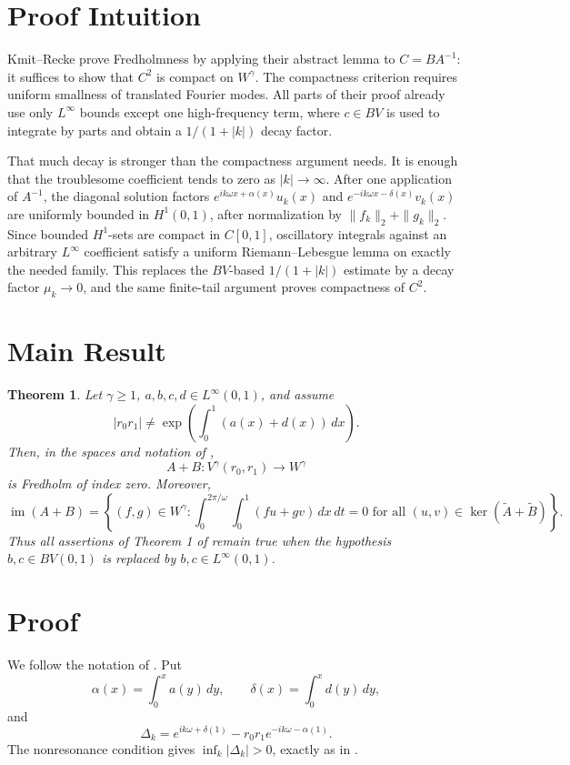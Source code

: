 \documentclass[11pt]{article}
\newtheorem{theorem}{Theorem}
\newcommand{\om}{\omega}
\newcommand{\ga}{\gamma}
\newcommand{\al}{\alpha}
\newcommand{\de}{\delta}
\newcommand{\Linfty}{L^\infty}
\newcommand{\im}{\operatorname{im}}
\begin{document}
\section*{Proof Intuition}

Kmit--Recke prove Fredholmness by applying their abstract lemma to
\(C=BA^{-1}\): it suffices to show that \(C^2\) is compact on \(W^\ga\).
The compactness criterion requires uniform smallness of translated Fourier
modes. All parts of their proof already use only \(L^\infty\) bounds except one
high-frequency term, where \(c\in BV\) is used to integrate by parts and obtain
a \(1/(1+|k|)\) decay factor.

That much decay is stronger than the compactness argument needs. It is enough
that the troublesome coefficient tends to zero as \(|k|\to\infty\). After one
application of \(A^{-1}\), the diagonal solution factors
\(e^{ik\om x+\al(x)}u_k(x)\) and \(e^{-ik\om x-\de(x)}v_k(x)\) are uniformly
bounded in \(H^1(0,1)\), after normalization by
\(\|f_k\|_2+\|g_k\|_2\). Since bounded \(H^1\)-sets are compact in \(C[0,1]\),
oscillatory integrals against an arbitrary \(L^\infty\) coefficient satisfy a
uniform Riemann--Lebesgue lemma on exactly the needed family. This replaces the
\(BV\)-based \(1/(1+|k|)\) estimate by a decay factor \(\mu_k\to 0\), and the
same finite-tail argument proves compactness of \(C^2\).

\section*{Main Result}

\begin{theorem}
Let \(\ga\ge 1\), \(a,b,c,d\in \Linfty(0,1)\), and assume
\[
  |r_0r_1|\ne
  \exp\left(\int_0^1(a(x)+d(x))\,dx\right).
\]
Then, in the spaces and notation of \cite{KmitRecke2007},
\[
  A+B:V^\ga(r_0,r_1)\longrightarrow W^\ga
\]
is Fredholm of index zero. Moreover,
\[
  \im(A+B)=
  \left\{(f,g)\in W^\ga:
  \int_0^{2\pi/\om}\int_0^1(fu+gv)\,dx\,dt=0
  \text{ for all }(u,v)\in\ker(\widetilde A+\widetilde B)\right\}.
\]
Thus all assertions of Theorem 1 of \cite{KmitRecke2007} remain true when
the hypothesis \(b,c\in BV(0,1)\) is replaced by \(b,c\in \Linfty(0,1)\).
\end{theorem}

\section*{Proof}

We follow the notation of \cite{KmitRecke2007}. Put
\[
  \al(x)=\int_0^x a(y)\,dy,\qquad
  \de(x)=\int_0^x d(y)\,dy,
\]
and
\[
  \Delta_k=e^{ik\om+\de(1)}-r_0r_1e^{-ik\om-\al(1)}.
\]
The nonresonance condition gives \(\inf_k|\Delta_k|>0\), exactly as in
\cite[(3.8)]{KmitRecke2007}.
\end{document}
